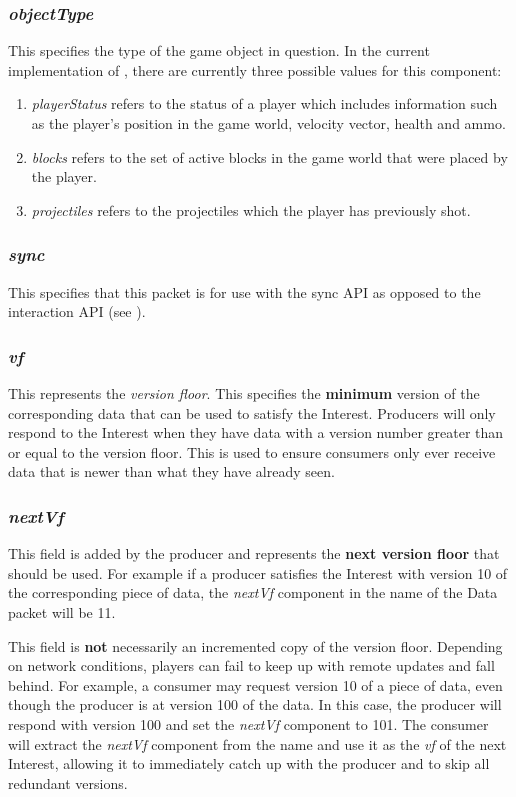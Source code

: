 \subsubsection{\textit{objectType}}
This specifies the type of the game object in question. In the current implementation of \game{}, there are currently three possible values for this component:
\begin{enumerate}
    \item \textit{playerStatus} refers to the status of a player which includes information such as the player's position in the game world, velocity vector, health and ammo.
    \item \textit{blocks} refers to the set of active blocks in the game world that were placed by the player.
    \item \textit{projectiles} refers to the projectiles which the player has previously shot.
\end{enumerate}

\subsubsection{\textit{sync}}
This specifies that this packet is for use with the sync API as opposed to the interaction API (see ).

\subsubsection{\textit{vf}}
This represents the \textit{version floor}. This specifies the \textbf{minimum} version of the corresponding data that can be used to satisfy the Interest. Producers will only respond to the Interest when they have data with a version number greater than or equal to the version floor. This is used to ensure consumers only ever receive data that is newer than what they have already seen.

\subsubsection{\textit{nextVf}}
This field is added by the producer and represents the \textbf{next version floor} that should be used. For example if a producer satisfies the Interest with version 10 of the corresponding piece of data, the \textit{nextVf} component in the name of the Data packet will be 11.

This field is \textbf{not} necessarily an incremented copy of the version floor. Depending on network conditions, players can fail to keep up with remote updates and fall behind. For example, a consumer may request version 10 of a piece of data, even though the producer is at version 100 of the data. In this case, the producer will respond with version 100 and set the \textit{nextVf} component to 101. The consumer will extract the \textit{nextVf} component from the name and use it as the \textit{vf} of the next Interest, allowing it to immediately catch up with the producer and to skip all redundant versions.


